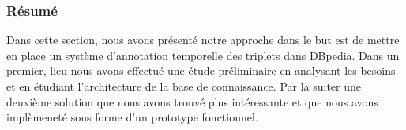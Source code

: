 \documentclass[12pt,a4	]{report}
\begin{document}
\subsubsection*{Résumé}

Dans cette section, nous avons présenté notre approche dans le but est de mettre en place un système d'annotation temporelle des triplets dans DBpedia. Dans un premier, lieu nous avons effectué une étude préliminaire en analysant les besoins et en étudiant l'architecture de la base de connaissance.
Par la suiter une deuxième solution que nous avons trouvé plus intéressante et que nous avons implèmeneté  sous forme d'un prototype fonctionnel.
\paragraph{}

\end{document}
